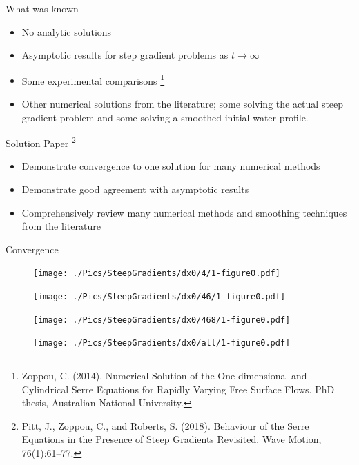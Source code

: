 \documentclass[pdf]{beamer}
\begin{document}
\begin{frame}{What was known}
	\begin{itemize}
		\item No analytic solutions
		\item Asymptotic results for step gradient problems as $t \rightarrow \infty$
		\item Some experimental comparisons \footnote{Zoppou, C. (2014).
			Numerical Solution of the One-dimensional and Cylindrical
			Serre Equations for Rapidly Varying Free Surface Flows. PhD thesis, Australian National University.}
		\item Other numerical solutions from the literature; some solving the actual steep gradient problem and some solving a smoothed initial water profile.
		\end{itemize}
\end{frame}

\begin{frame}{Solution}
	Paper \footnote{Pitt, J., Zoppou, C., and Roberts, S. (2018).
		Behaviour of the Serre Equations in the Presence of Steep
		Gradients Revisited.
		Wave Motion, 76(1):61–77.}
	\begin{itemize}
		\item Demonstrate convergence to one solution for many numerical methods
		\item Demonstrate good agreement with asymptotic results
		\item Comprehensively review many numerical methods and smoothing techniques from the literature
	\end{itemize}
	
\end{frame}

\begin{frame}{Convergence}
		\begin{figure}
			\texttt{[image: ./Pics/SteepGradients/dx0/4/1-figure0.pdf]}
		\end{figure}
\end{frame}
\begin{frame}
	\begin{figure}
		\texttt{[image: ./Pics/SteepGradients/dx0/46/1-figure0.pdf]}
	\end{figure}
\end{frame}
\begin{frame}
	\begin{figure}
		\texttt{[image: ./Pics/SteepGradients/dx0/468/1-figure0.pdf]}
	\end{figure}
\end{frame}
\begin{frame}
	\begin{figure}
		\texttt{[image: ./Pics/SteepGradients/dx0/all/1-figure0.pdf]}
	\end{figure}
\end{frame}
\end{document}
